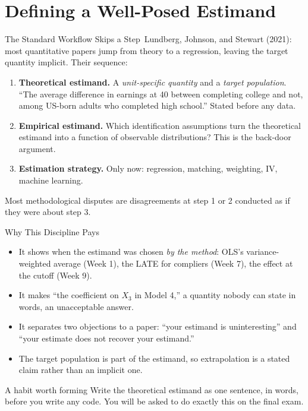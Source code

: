\documentclass[aspectratio=169,11pt,xcolor=dvipsnames]{beamer}
\newcommand{\srct}[1]{#1}
\newcommand{\core}{\,\raisebox{0.6pt}{\textcolor{corestar}{$\bigstar$}}}
\begin{document}
\section[Estimands]{Defining a Well-Posed Estimand}
\begin{frame}\sectionpage\end{frame}

\begin{frame}{The Standard Workflow Skips a Step\core}
\srct{Lundberg, Johnson, and Stewart (2021)}: most quantitative papers jump
from theory to a regression, leaving the target quantity implicit. Their
sequence:
\begin{enumerate}\itemsep4pt
  \item \textbf{Theoretical estimand.} A \emph{unit-specific quantity} and a
        \emph{target population}. ``The average difference in earnings at
        40 between completing college and not, among US-born adults who
        completed high school.'' Stated before any data.
  \item \textbf{Empirical estimand.} Which identification assumptions turn
        the theoretical estimand into a function of observable distributions?
        This is the back-door argument.
  \item \textbf{Estimation strategy.} Only now: regression, matching,
        weighting, IV, machine learning.
\end{enumerate}
\vskip4pt
\alert{Most methodological disputes are disagreements at step 1 or 2}
conducted as if they were about step 3.
\end{frame}

\begin{frame}{Why This Discipline Pays}
\begin{itemize}\itemsep4pt
  \item It shows when the estimand was chosen \emph{by the method}: OLS's
        variance-weighted average (Week 1), the LATE for compliers (Week 7),
        the effect at the cutoff (Week 9).
  \item It makes ``the coefficient on $X_3$ in Model 4,'' a quantity nobody
        can state in words, an unacceptable answer.
  \item It separates two objections to a paper: ``your estimand is
        uninteresting'' and ``your estimate does not recover your estimand.''
  \item The target population is part of the estimand, so extrapolation is a
        stated claim rather than an implicit one.
\end{itemize}
\vskip4pt
\begin{alertblock}{A habit worth forming}
Write the theoretical estimand as one sentence, in words, before you write any
code. You will be asked to do exactly this on the final exam.
\end{alertblock}
\end{frame}
\end{document}
